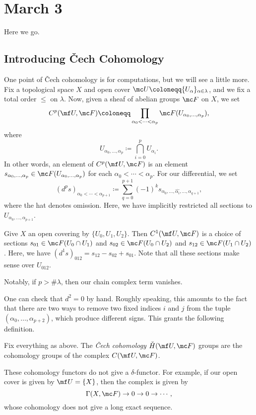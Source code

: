 \documentclass[../notes.tex]{subfiles}
\begin{document}
\section{March 3}

Here we go.

\subsection{Introducing \v Cech Cohomology}
One point of \v Cech cohomology is for computations, but we will see a little more. Fix a topological space $X$ and open cover $\mc U\coloneqq\{U_\alpha\}_{\alpha\in\lambda}$, and we fix a total order $\le$ on $\lambda$. Now, given a sheaf of abelian groups $\mc F$ on $X$, we set
\[C^p(\mf U,\mc F)\coloneqq\prod_{\alpha_0<\cdots<\alpha_p}\mc F(U_{\alpha_0,\ldots,\alpha_p}),\]
where
\[U_{\alpha_0,\ldots,\alpha_p}\coloneqq\bigcap_{i=0}^pU_{\alpha_i}.\]
In other words, an element of $C^p(\mf U,\mc F)$ is an element $s_{\alpha_0,\ldots,\alpha_p}\in\mc F(U_{\alpha_0,\ldots,\alpha_p})$ for each $\alpha_0<\cdots<\alpha_p$. For our differential, we set
\[\left(d^ps\right)_{\alpha_0<\cdots<\alpha_{p+1}}\coloneqq\sum_{q=0}^{p+1}(-1)^ks_{\alpha_0,\ldots,\widehat{\alpha_i},\ldots,\alpha_{q+1}},\]
where the hat denotes omission. Here, we have implicitly restricted all sections to $U_{\alpha_0,\ldots,\alpha_{p+1}}$.
\begin{example}
	Give $X$ an open covering by $\{U_0,U_1,U_2\}$. Then $C^1(\mf U,\mc F)$ is a choice of sections $s_{01}\in\mc F(U_0\cap U_1)$ and $s_{02}\in\mc F(U_0\cap U_2)$ and $s_{12}\in\mc F(U_1\cap U_2)$. Here, we have $\left(d^1s\right)_{012}=s_{12}-s_{02}+s_{01}$. Note that all these sections make sense over $U_{012}$.
\end{example}
\begin{remark}
	Notably, if $p>\#\lambda$, then our chain complex term vanishes.
\end{remark}
One can check that $d^2=0$ by hand. Roughly speaking, this amounts to the fact that there are two ways to remove two fixed indices $i$ and $j$ from the tuple $(\alpha_0,\ldots,\alpha_{p+2})$, which produce different signs. This grants the following definition.
\begin{defihelper} 
	Fix everything as above. The \textit{\v Cech cohomology} $\check H(\mf U,\mc F)$ groups are the cohomology groups of the complex $C(\mf U,\mc F)$.
\end{defihelper}
\begin{remark}
	These cohomology functors do not give a $\delta$-functor. For example, if our open cover is given by $\mf U=\{X\}$, then the complex is given by
	\[\Gamma(X,\mc F)\to0\to0\to\cdots,\]
	whose cohomology does not give a long exact sequence.
\end{remark}
\end{document}
